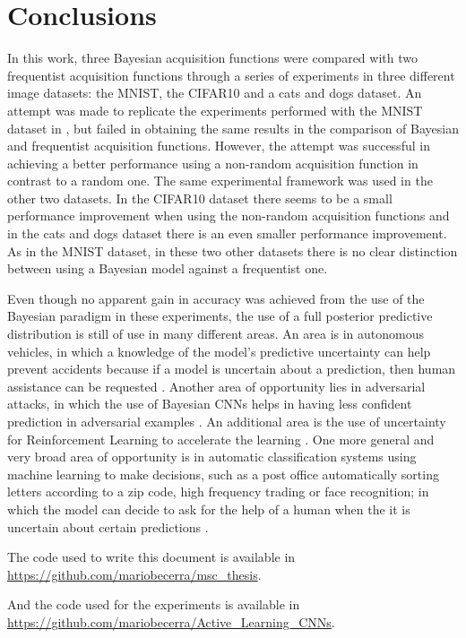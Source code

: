 
\chapter{Conclusions}
\label{ch:conclusions}


In this work, three Bayesian acquisition functions were compared with two frequentist acquisition functions through a series of experiments in three different image datasets: the MNIST, the CIFAR10 and a cats and dogs dataset. An attempt was made to replicate the experiments performed with the MNIST dataset in \cite{Gal2016Active}, but failed in obtaining the same results in the comparison of Bayesian and frequentist acquisition functions. However, the attempt was successful in achieving a better performance using a non-random acquisition function in contrast to a random one. The same experimental framework was used in the other two datasets. In the CIFAR10 dataset there seems to be a small performance improvement when using the non-random acquisition functions and in the cats and dogs dataset there is an even smaller performance improvement. As in the MNIST dataset, in these two other datasets there is no clear distinction between using a Bayesian model against a frequentist one.

Even though no apparent gain in accuracy was achieved from the use of the Bayesian paradigm in these experiments, the use of a full posterior predictive distribution is still of use in many different areas. An area is in autonomous vehicles, in which a knowledge of the model's predictive uncertainty can help prevent accidents because if a model is uncertain about a prediction, then human assistance can be requested \cite{gal2016uncertainty, kendall2017uncertainties, michelmore2018evaluating}. Another area of opportunity lies in adversarial attacks, in which the use of Bayesian CNNs helps in having less confident prediction in adversarial examples \cite{li2017dropout, rawat2017adversarial, smith2018understanding}. An additional area is the use of uncertainty for Reinforcement Learning to accelerate the learning \cite{gal2016uncertainty}. One more general and very broad area of opportunity is in automatic classification systems using machine learning to make decisions, such as a post office automatically sorting letters according to a zip code, high frequency trading or face recognition; in which the model can decide to ask for the help of a human when the it is uncertain about certain predictions \cite{gal2016uncertainty}.

The code used to write this document is available in \url{https://github.com/mariobecerra/msc_thesis}.

And the code used for the experiments is available in \url{https://github.com/mariobecerra/Active_Learning_CNNs}.

